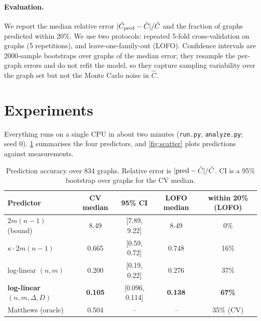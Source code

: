 \documentclass{article}
\begin{document}
\paragraph{Evaluation.} We report the median relative error $|\hat C_{\rm pred}-\hat C|/\hat C$ and the fraction of graphs predicted within 20\%. We use two protocols: repeated 5-fold cross-validation on graphs (5 repetitions), and leave-one-family-out (LOFO). Confidence intervals are 2000-sample bootstraps over graphs of the median error; they resample the per-graph errors and do not refit the model, so they capture sampling variability over the graph set but not the Monte Carlo noise in $\hat C$.

\section{Experiments}
\label{sec:exp}
Everything runs on a single CPU in about two minutes (\texttt{run.py}, \texttt{analyze.py}; seed 0). \cref{tab:main} summarises the four predictors, and \cref{fig:scatter} plots predictions against measurements.

\begin{table}[t]
\caption{Prediction accuracy over 834 graphs. Relative error is $|{\rm pred}-\hat C|/\hat C$. CI is a 95\% bootstrap over graphs for the CV median.}
\label{tab:main}
\begin{center}
\begin{small}
\begin{tabular}{lcccc}
\toprule
Predictor & CV median & 95\% CI & LOFO median & within 20\% (LOFO)\\
\midrule
$2m(n-1)$ (bound) & 8.49 & [7.89, 9.22] & 8.49 & 0\% \\
$\kappa\cdot 2m(n-1)$ & 0.665 & [0.59, 0.72] & 0.748 & 16\% \\
log-linear $(n,m)$ & 0.200 & [0.19, 0.22] & 0.276 & 37\% \\
\textbf{log-linear $(n,m,\Delta,D)$} & \textbf{0.105} & [0.096, 0.114] & \textbf{0.138} & \textbf{67\%} \\
Matthews (oracle) & 0.504 & -- & -- & 35\% (CV) \\
\bottomrule
\end{tabular}
\end{small}
\end{center}
\vskip -0.1in
\end{table}
\end{document}
